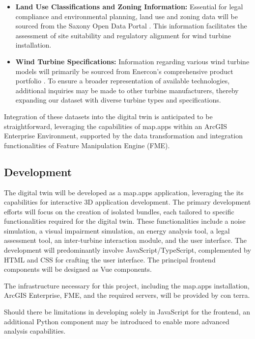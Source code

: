 \documentclass[11pt, titlepage, a4paper]{article}
\begin{document}
\begin{linenumbers}
\begin{itemize}
        \item \textbf{Land Use Classifications and Zoning Information:} Essential for legal compliance and environmental planning, land use and zoning data will be sourced from the Saxony Open Data Portal \cite{freistaatsachsenOpenDataPortal}. This information facilitates the assessment of site suitability and regulatory alignment for wind turbine installation.

        \item \textbf{Wind Turbine Specifications:} Information regarding various wind turbine models will primarily be sourced from Enercon’s comprehensive product portfolio \cite{enerconglobalgmbhENERCONWindenergieanlagen}. To ensure a broader representation of available technologies, additional inquiries may be made to other turbine manufacturers, thereby expanding our dataset with diverse turbine types and specifications.
    \end{itemize}

    Integration of these datasets into the digital twin is anticipated to be straightforward, leveraging the capabilities of map.apps within an ArcGIS Enterprise Environment, supported by the data transformation and integration functionalities of Feature Manipulation Engine (FME).


    \subsection{Development}
    The digital twin will be developed as a map.apps application, leveraging the its capabilities for interactive 3D application development. The primary development efforts will focus on the creation of isolated bundles, each tailored to specific functionalities required for the digital twin. These functionalities include a noise simulation, a visual impairment simulation, an energy analysis tool, a legal assessment tool, an inter-turbine interaction module, and the user interface. The development will predominantly involve JavaScript/TypeScript, complemented by HTML and CSS for crafting the user interface. The principal frontend components will be designed as Vue components.

    The infrastructure necessary for this project, including the map.apps installation, ArcGIS Enterprise, FME, and the required servers, will be provided by con terra.

    Should there be limitations in developing solely in JavaScript for the frontend, an additional Python component may be introduced to enable more advanced analysis capabilities.




\end{linenumbers}
\end{document}
